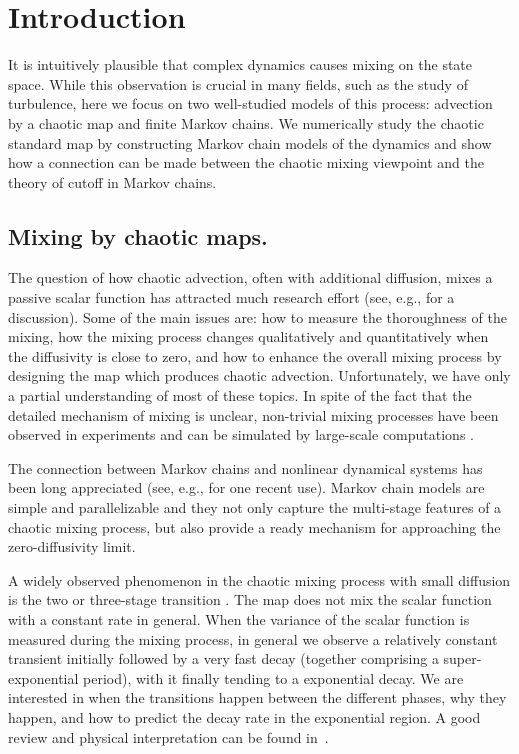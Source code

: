 \documentclass{aims}
\theoremstyle{definition}
\begin{document}
%
%
\section{Introduction}
\label{sec:numcutoffintro}

It is intuitively plausible that complex dynamics causes mixing on the
state space. While this observation is crucial in many fields, such as
the study of turbulence, here we focus on two well-studied models of
this process: advection by a chaotic map and finite Markov chains. We
numerically study the chaotic standard map by constructing Markov
chain models of the dynamics and show how a connection can be made
between the chaotic mixing viewpoint and the theory of cutoff in
Markov chains.

\subsection{Mixing by chaotic maps.}
The question of how chaotic advection, often with additional
diffusion, mixes a passive scalar function has attracted much research
effort (see, e.g., \cite{Ottino2004} for a discussion). Some of the
main issues are: how to measure the thoroughness of the mixing, how
the mixing process changes qualitatively and quantitatively when the
diffusivity is close to zero, and how to enhance the overall mixing
process by designing the map which produces chaotic
advection. Unfortunately, we have only a partial understanding of most
of these topics. In spite of the fact that the detailed mechanism of
mixing is unclear, non-trivial mixing processes have been observed in
experiments \cite{Rothstein1999, Voth2002} and can be simulated by
large-scale computations \cite{topopt, Tsang2005}.

The connection between Markov chains and nonlinear dynamical systems
has been long appreciated (see, e.g., \cite{Dellnitz1999,
  Dellnitz2002, Froyland1998, Froyland1999, Froyland2001} for one
recent use). Markov chain models are simple and parallelizable and
they not only capture the multi-stage features of a chaotic mixing
process, but also provide a ready mechanism for approaching the
zero-diffusivity limit.

A widely observed phenomenon in the chaotic mixing process with small
diffusion is the two or three-stage transition
\cite{Thiffeault2003-13, Fereday2002, Antonsen1996, Mezic2005}. The
map does not mix the scalar function with a constant rate in
general. When the variance of the scalar function is measured during
the mixing process, in general we observe a relatively constant
transient initially followed by a very fast decay (together comprising
a super-exponential period), with it finally tending to a exponential
decay. We are interested in when the transitions happen between the
different phases, why they happen, and how to predict the decay rate
in the exponential region. A good review and physical interpretation
can be found in~\cite{Thiffeault2004}.
\end{document}
